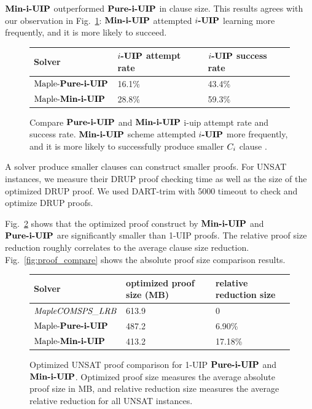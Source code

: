 \documentclass[runningheads]{llncs}
\begin{document}
$\textbf{Min-i-UIP}$ outperformed $\textbf{Pure-i-UIP}$ in clause size.  This results agrees with our observation in Fig.~\ref{fig:t2}: $\textbf{Min-i-UIP}$ attempted $\textbf{$i$-UIP}$ learning more frequently, and it is more likely to succeed.  

\begin{figure} 
\begin{center} 
\begin{tabular}{ | m{3.5cm} | m{5cm}| m{3.5cm} | } 
\hline
Solver & $\textbf{$i$-UIP}$ attempt rate & $\textbf{$i$-UIP}$ success rate  \\ 
\hline
$\text{Maple-\textbf{Pure-i-UIP}}$ & 16.1\% & 43.4\% \\ 
\hline
$\text{Maple-\textbf{Min-i-UIP}}$ & 28.8\% & 59.3\% \\ 
\hline
\end{tabular}
\end{center}
\caption{Compare $\textbf{Pure-i-UIP}$ and $\textbf{Min-i-UIP}$ i-uip attempt rate and success rate. $\textbf{Min-i-UIP}$ scheme attempted $\textbf{$i$-UIP}$ more frequently, and it is more likely to successfully produce smaller $C_{i}$ clause .}
\label{fig:t2}
\end{figure}

A solver produce smaller clauses can construct smaller proofs. For
UNSAT instances, we measure their DRUP\cite{} proof checking time as
well as the size of the optimized DRUP proof. We used DART-trim
\cite{} with 5000 timeout to check and optimize DRUP proofs.

Fig.~\ref{fig:t3} shows that the optimized proof construct by
$\textbf{Min-i-UIP}$ and $\textbf{Pure-i-UIP}$ are significantly smaller than 1-UIP
proofs. The relative proof size reduction roughly correlates to the
average clause size reduction. Fig.~\ref{fig:proof_compare} shows the
absolute proof size comparison results.

\begin{figure} 
\begin{center} 
\begin{tabular}{ | m{3.5cm} | m{5cm}| m{3.5cm} | } 
\hline
Solver & optimized proof size (MB) & relative reduction size  \\ 
\hline
$\textit{MapleCOMSPS\_LRB}$ & 613.9 & 0  \\ 
\hline
$\text{Maple-\textbf{Pure-i-UIP}}$ & 487.2 & 6.90\% \\ 
\hline
$\text{Maple-\textbf{Min-i-UIP}}$ & 413.2 & 17.18\% \\ 
\hline
\end{tabular}
\end{center}
\caption{Optimized UNSAT proof comparison for 1-UIP $\textbf{Pure-i-UIP}$ and $\textbf{Min-i-UIP}$. Optimized proof size measures the average absolute proof size in MB, and relative reduction size measures the average relative reduction for all UNSAT instances.}
\label{fig:t3}
\end{figure}
\end{document}
